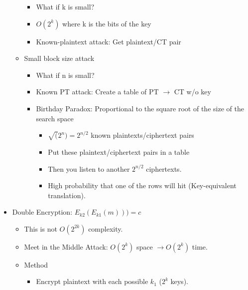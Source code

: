 \begin{itemize}
\begin{itemize}
        \begin{itemize}
        \item What if k is small?
        \item $O(2^k)$ where k is the bits of the key
        \item Known-plaintext attack: Get plaintext/CT pair
        \end{itemize}
    \item Small block size attack
        \begin{itemize}
        \item What if n is small?
        \item Known PT attack: Create a table of PT $\rightarrow$ CT w/o key
        \item Birthday Paradox: Proportional to the square root of the size of the search space
            \begin{itemize}
            \item $\sqrt(2^n) = 2^{n/2}$ known plaintexts/ciphertext pairs
            \item Put these plaintext/ciphertext pairs in a table
            \item Then you listen to another $2^{n/2}$ ciphertexts.
            \item High probability that one of the rows will hit (Key-equivalent translation).
            \end{itemize}
        \end{itemize}
    \end{itemize}
\item Double Encryption: $E_{k2}(E_{k1}(m))) = c$
    \begin{itemize}
    \item This is not $O(2^{2k})$ complexity.
    \item Meet in the Middle Attack: $O(2^k)$ space $\rightarrow O(2^k)$ time.
    \item Method
        \begin{itemize}
        \item Encrypt plaintext with each possible $k_1$ ($2^k$ keys).
        \end{itemize}
    \end{itemize}
\end{itemize}